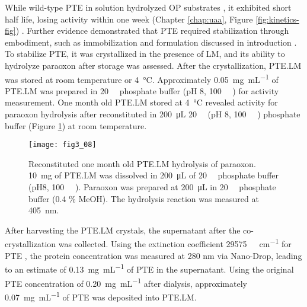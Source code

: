 \begin{refsection}
While wild-type PTE in solution hydrolyzed OP substrates \cite{Yang2014a,Baker2011b},
it exhibited short half life, losing activity within one week (Chapter
\ref{chap:uaa}, Figure \ref{fig:kinetics-fig}) \cite{Yang2014a}. Further
evidence demonstrated that PTE required stabilization through embodiment, such
as immobilization and formulation discussed in introduction
\cite{Chen1998,Gill2000,Havens1993,Masson2009a}. To stabilize PTE, it was
crystallized in the presence of LM, and its ability to hydrolyze paraoxon after
storage was assessed. After the crystallization, PTE.LM was stored at room
temperature or \SI{4}{\celsius}. Approximately \SI{0.05}{\mg\per\mL} of PTE.LM
was prepared in \SI{20}{\milli\Molar} phosphate buffer (pH 8,
\SI{100}{\micro\Molar} ) for activity measurement. One month old
PTE.LM stored at \SI{4}{\celsius} revealed activity for paraoxon hydrolysis
after reconstituted in \SI{200}{\micro\liter} \SI{20}{\milli\Molar} (pH 8,
\SI{100}{\micro\Molar} ) phosphate buffer (Figure
\ref{fig:ptelm-one-month}) at room temperature. 
\begin{figure}[htbp] \centering \texttt{[image: fig3\_08]}
    \caption[Reconstituted one month old PTE.LM hydrolysis of paraoxon.
        \SI{10}{\mg} of PTE.LM was dissolved in \SI{200}{\micro\liter} of
        \SI{20}{\milli\Molar} phosphate buffer. Paraoxon was prepared at
        \SI{200}{\micro\liter} in \SI{20}{\milli\Molar} phosphate buffer (0.4
    \% MeOH). The hydrolysis reaction was measured at \SI{405}{\nm}.]
    {Reconstituted one month old PTE.LM hydrolysis of paraoxon.  \SI{10}{\mg}
    of PTE.LM was dissolved in \SI{200}{\micro\liter} of \SI{20}{\milli\Molar}
    phosphate buffer (pH8, \SI{100}{\micro\Molar} ).  Paraoxon was
    prepared at \SI{200}{\micro\liter} in \SI{20}{\milli\Molar} phosphate
    buffer  (0.4 \% MeOH).  The hydrolysis reaction was measured at
    \SI{405}{\nm}.} \label{fig:ptelm-one-month} 
\end{figure}

After harvesting the PTE.LM crystals, the supernatant after the co-crystallization
was collected. Using the extinction coefficient \SI{29575}{\per\Molar\per\cm}
for PTE \cite{Gasteiger2005, Pace1995}, the protein concentration was measured
at 280 nm via Nano-Drop, leading to an estimate of \SI{0.13}{\mg\per\mL} of PTE
in the supernatant. Using the original PTE concentration of
\SI{0.20}{\mg\per\mL} after dialysis, approximately \SI{0.07}{\mg\per\mL}
of PTE was deposited into PTE.LM. 


\end{refsection}
